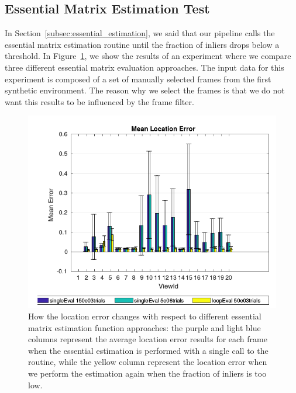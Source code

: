 \subsection{Essential Matrix Estimation Test}\label{subsec:essential_test}
In Section~\ref{subsec:essential_estimation}, we said that our pipeline
calls the essential matrix estimation routine until the fraction of inliers
drops below a threshold. In Figure~\ref{fig:essential_test}, we show the
results of an experiment where we compare three different essential matrix
evaluation approaches. The input data for this experiment is composed of
a set of manually selected frames from the first synthetic environment.
The reason why we select the frames is that we do not want this results to be
influenced by the frame filter.
%
\begin{figure}[h]
\centering
\includegraphics[width=\linewidth]{img/essentialEstimation.png}
\caption{How the location error changes with respect to different essential
matrix estimation function approaches: the purple and light blue columns
represent the average location error results for each frame when the
essential estimation is performed with a single call to the routine, while the
yellow column represent the location error when we perform the estimation
again when the fraction of inliers is too low.}
\label{fig:essential_test}
\end{figure}

